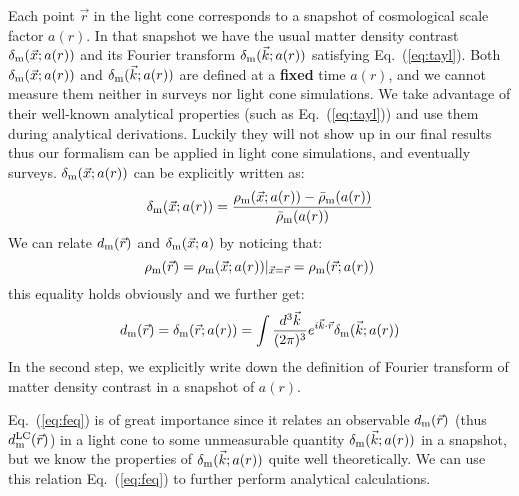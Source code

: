 \documentclass[prd,amsmath,amssymb,floatfix,superscriptaddress,nofootinbib,twocolumn]{revtex4-1}
\def\be{\begin{equation}}
\def\ee{\end{equation}}
\newcommand{\vrr}{\vec{r}}
\newcommand{\vk}{\vec{k}}
\newcommand{\ec}[1]{Eq.~(\ref{eq:#1})}
\newcommand{\eql}[1]{\label{eq:#1}}
\begin{document}
Each point $\vrr$ in the light cone corresponds to a snapshot of cosmological scale factor $a(r)$. In that snapshot we have the usual matter density contrast $\delta_{\rm m}(\vec{x};a(r))$ and its Fourier transform $\delta_{\rm m}(\vec{k};a(r))$ satisfying \ec{tayl}. Both $\delta_{\rm m}(\vec{x};a(r))$ and $\delta_{\rm m}(\vec{k};a(r))$ are defined at a \textbf{fixed} time $a(r)$, and we cannot measure them neither in surveys nor light cone simulations. We take advantage of their well-known analytical properties (such as \ec{tayl}) and use them during analytical derivations. Luckily they will not show up in our final results thus our formalism can be applied in light cone simulations, and eventually surveys. $\delta_{\rm m}(\vec{x};a(r))$ can be explicitly written as:
\be 
\delta_{\rm m}(\vec{x};a(r))=\frac{\rho_{\rm m}(\vec{x};a(r))-\bar{\rho}_{\rm m}(a(r))}{\bar{\rho}_{\rm m}(a(r))}
\ee 
We can relate $d_{\rm m}(\vrr)$ and $\delta_{\rm m}(\vec{x};a)$ by noticing that:
\be
\rho_{\rm m}(\vrr)=\rho_{\rm m}(\vec{x};a(r))|_{\vec{x}=\vrr}=\rho_{\rm m}(\vrr;a(r))
\ee
this equality holds obviously and we further get:
\be 
d_{\rm m}(\vrr) = \delta_{\rm m}(\vrr;a(r)) =\int \frac{d^3 \vk}{(2\pi)^3}e^{i\vk\cdot\vrr}\delta_{\rm m}(\vk;a(r))\eql{feq}
\ee 
In the second step, we explicitly write down the definition of Fourier transform of matter density contrast in a snapshot of $a(r)$. 

\ec{feq} is of great importance since it relates an observable $d_{\rm m}(\vrr)$ (thus $d^{\rm LC}_{\rm m}(\vrr)$) in a light cone to some unmeasurable quantity $\delta_{\rm m}(\vk;a(r))$ in a snapshot, but we know the properties of $\delta_{\rm m}(\vk;a(r))$ quite well theoretically. We can use this relation \ec{feq} to further perform analytical calculations.
\end{document}
